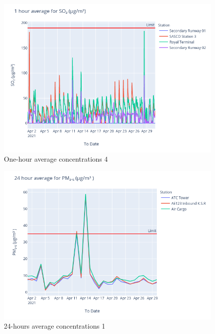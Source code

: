\documentclass[12pt, oneside]{book}
\begin{document}
{
{\begin{figure}[H]
\centering
\includegraphics[width=\textwidth]{image221}
\caption{One-hour average  concentrations 4}\label{image221}
\end{figure}}{}

{\begin{figure}[H]
\centering
\includegraphics[width=\textwidth]{image186}
\caption{24-hours average  concentrations 1}\label{image186}
\end{figure}}{}


}
\end{document}
